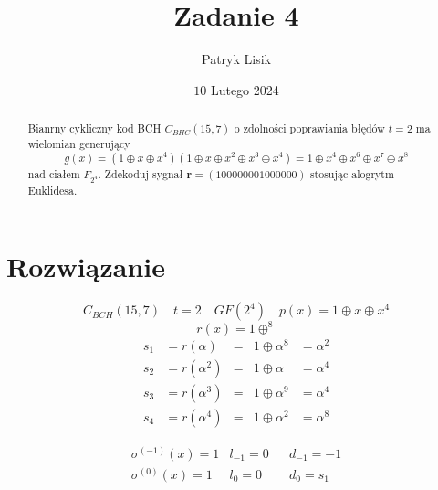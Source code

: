 \documentclass[12pt]{article}
\title{Zadanie 4}
\author{Patryk Lisik}
\date{\(10\) Lutego  2024}
\begin{document}
    \maketitle
    \renewcommand{\abstractname}{Treść}

    \begin{abstract}
        Bianrny cykliczny kod BCH $C_{BHC}(15,7)$ o zdolności poprawiania błędów $t=2$ ma wielomian generujący 
        $$ g(x) = (1\oplus x \oplus x^4)(1 \oplus x \oplus x^2 \oplus x^3 \oplus x^4) = 1 \oplus x^4 \oplus x^6 \oplus x^7 \oplus x^8 $$
           nad ciałem $ F_{2^4} $. Zdekoduj sygnał $\mathbf{r}= (100000001000000)$ stosując alogrytm Euklidesa.
    \end{abstract}



    \section*{Rozwiązanie}

    $$C_{BCH}(15,7) \quad t=2 \quad GF(2^4) \quad p(x)=1\oplus x \oplus x^4 $$
    $$ r(x) =  1\oplus ^8     $$
    \begin{align*}
        s_1 & = r(\alpha )   & = &  1 \oplus \alpha^8 & = \alpha ^2  \\
        s_2 & = r(\alpha ^2) & = & 1 \oplus \alpha    & = \alpha ^4  \\
        s_3 & = r(\alpha ^3) & = & 1 \oplus \alpha ^9  & = \alpha ^4  \\
        s_4 & = r(\alpha ^4) & = & 1 \oplus \alpha ^2  & = \alpha ^8  
    \end{align*}

    \begin{align*}
        &\sigma^{(-1)}(x)=1 & l_{-1}=0 &  & d_{-1} =-1   & \\
        &\sigma^{(0)}(x)=1  & l_{0} =0 &  & d_{0}  =s_1   & \\
    \end{align*}
\end{document}
